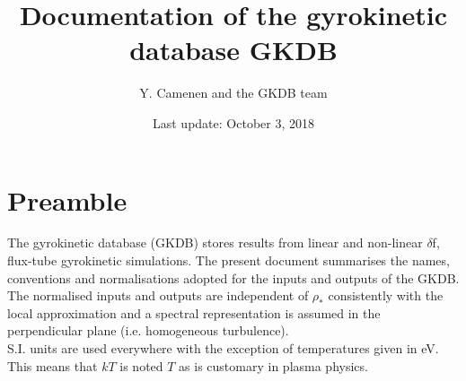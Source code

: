\documentclass[a4paper]{report}
\begin{document}
\title{Documentation of the  gyrokinetic database GKDB}

\author{Y. Camenen and the GKDB team}

\date{Last update: October 3, 2018}

\maketitle


\tableofcontents

\chapter{Preamble}

The gyrokinetic database (GKDB) stores results from linear and non-linear $\delta$f, flux-tube gyrokinetic simulations. The present document summarises the names, conventions and normalisations adopted for the inputs and outputs of the  GKDB.\\ 
The normalised inputs and outputs are independent of $\rho_*$ consistently with the local approximation and a spectral representation is assumed in the perpendicular plane (i.e. homogeneous turbulence).\\
S.I. units are used everywhere with the exception of temperatures given in eV. This means that $kT$ is noted $T$ as is customary in plasma physics.
\end{document}
